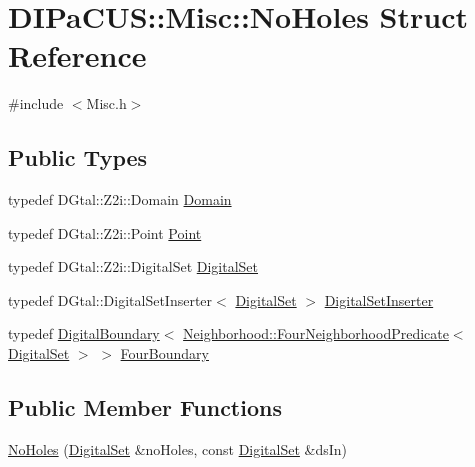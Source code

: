 \hypertarget{structDIPaCUS_1_1Misc_1_1NoHoles}{}\section{D\+I\+Pa\+C\+US\+:\+:Misc\+:\+:No\+Holes Struct Reference}
\label{structDIPaCUS_1_1Misc_1_1NoHoles}


{\ttfamily \#include $<$Misc.\+h$>$}

\subsection*{Public Types}
\begin{DoxyCompactItemize}
\item 
typedef D\+Gtal\+::\+Z2i\+::\+Domain \mbox{\hyperlink{structDIPaCUS_1_1Misc_1_1NoHoles_a4cce903bbbf4efeeb5c3706f434e1800}{Domain}}
\item 
typedef D\+Gtal\+::\+Z2i\+::\+Point \mbox{\hyperlink{structDIPaCUS_1_1Misc_1_1NoHoles_a596a57c7b9badcf299feb9649c05158b}{Point}}
\item 
typedef D\+Gtal\+::\+Z2i\+::\+Digital\+Set \mbox{\hyperlink{structDIPaCUS_1_1Misc_1_1NoHoles_aea4bec251425e3c31593c97ec33a9dda}{Digital\+Set}}
\item 
typedef D\+Gtal\+::\+Digital\+Set\+Inserter$<$ \mbox{\hyperlink{structDIPaCUS_1_1Misc_1_1NoHoles_aea4bec251425e3c31593c97ec33a9dda}{Digital\+Set}} $>$ \mbox{\hyperlink{structDIPaCUS_1_1Misc_1_1NoHoles_a0d0daa979d1fce71944e06ad181ae6aa}{Digital\+Set\+Inserter}}
\item 
typedef \mbox{\hyperlink{structDIPaCUS_1_1Misc_1_1DigitalBoundary}{Digital\+Boundary}}$<$ \mbox{\hyperlink{classDIPaCUS_1_1Neighborhood_1_1FourNeighborhoodPredicate}{Neighborhood\+::\+Four\+Neighborhood\+Predicate}}$<$ \mbox{\hyperlink{structDIPaCUS_1_1Misc_1_1NoHoles_aea4bec251425e3c31593c97ec33a9dda}{Digital\+Set}} $>$ $>$ \mbox{\hyperlink{structDIPaCUS_1_1Misc_1_1NoHoles_ad5cd533619d917f3b39a78161eeec3ec}{Four\+Boundary}}
\end{DoxyCompactItemize}
\subsection*{Public Member Functions}
\begin{DoxyCompactItemize}
\item 
\mbox{\hyperlink{structDIPaCUS_1_1Misc_1_1NoHoles_ac100d4aa947d8acc9ae59739184ea488}{No\+Holes}} (\mbox{\hyperlink{structDIPaCUS_1_1Misc_1_1NoHoles_aea4bec251425e3c31593c97ec33a9dda}{Digital\+Set}} \&no\+Holes, const \mbox{\hyperlink{structDIPaCUS_1_1Misc_1_1NoHoles_aea4bec251425e3c31593c97ec33a9dda}{Digital\+Set}} \&ds\+In)
\end{DoxyCompactItemize}


